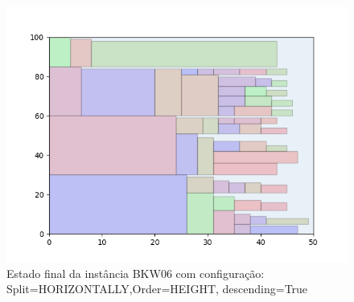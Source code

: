 \begin{figure}[H]
    \centering
    \caption[]{Estado final da instância BKW06 com configuração: Split=HORIZONTALLY,Order=HEIGHT, descending=True}
    \label{fig:bkw06-horizontally-height-true}
    \includegraphics[scale=0.5]{output/figures/bkw/bkw06/horizontally/height/true/00}
\end{figure}